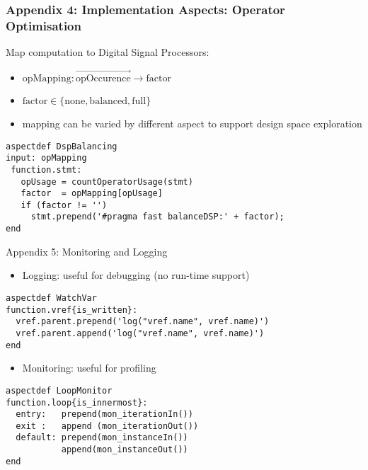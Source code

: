 \begin{frame}[fragile]
  \frametitle{Appendix 4: Implementation Aspects: Operator Optimisation}
  Map computation to Digital Signal Processors:
  \begin{itemize}
  \item $ \text{opMapping} : \overrightarrow{\text{opOccurence}} \rightarrow \text{factor}$
  \item $\text{factor} \in \{\text{none}, \text{balanced}, \text{full}\} $
  \item mapping can be varied by different aspect to support design
    space exploration
  \end{itemize}
  \begin{lstlisting}[label=lst:label, style=lara]
aspectdef DspBalancing
input: opMapping
 function.stmt:
   opUsage = countOperatorUsage(stmt)
   factor  = opMapping[opUsage]
   if (factor != '')
     stmt.prepend('#pragma fast balanceDSP:' + factor);
end
  \end{lstlisting}
\end{frame}

\begin{frame}[fragile]{Appendix 5: Monitoring and Logging}
  \begin{itemize}
  \item Logging: useful for debugging (no run-time support)
  \end{itemize}
  \begin{lstlisting}[label=lst:label, style=lara]
aspectdef WatchVar
function.vref{is_written}:
  vref.parent.prepend('log("vref.name", vref.name)')
  vref.parent.append('log("vref.name", vref.name)')
end
  \end{lstlisting}

  \begin{itemize}
  \item Monitoring: useful for profiling
  \end{itemize}
  \begin{lstlisting}[label=lst:label, style=lara]
aspectdef LoopMonitor
function.loop{is_innermost}:
  entry:   prepend(mon_iterationIn())
  exit :   append (mon_iterationOut())
  default: prepend(mon_instanceIn())
           append(mon_instanceOut())
end
  \end{lstlisting}
\end{frame}
